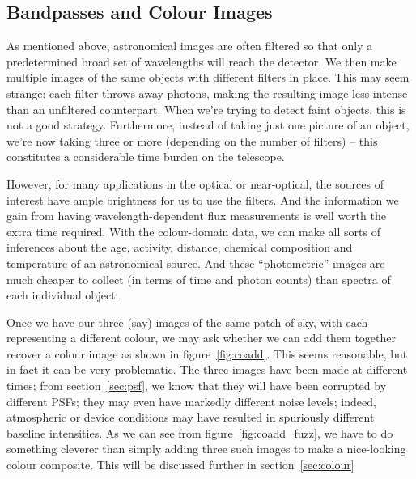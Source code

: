 \documentclass[letterpaper, 11pt]{article}
\begin{document}
\subsection{Bandpasses and Colour Images}
\label{sec:bands}

As mentioned above, astronomical images are often filtered so that only a predetermined broad set of wavelengths will reach the detector. We then make multiple images of the same objects with different filters in place. This may seem strange: each filter throws away photons, making the resulting image less intense than an unfiltered counterpart. When we're trying to detect faint objects, this is not a good strategy. Furthermore, instead of taking just one picture of an object, we're now taking three or more (depending on the number of filters) -- this constitutes a considerable time burden on the telescope.

However, for many applications in the optical or near-optical, the sources of interest have ample brightness for us to use the filters. And the information we gain from having wavelength-dependent flux measurements is well worth the extra time required. With the colour-domain data, we can make all sorts of inferences about the age, activity, distance, chemical composition and temperature of an astronomical source. And these ``photometric'' images are much cheaper to collect (in terms of time and photon counts) than spectra of each individual object.

Once we have our three (say) images of the same patch of sky, with each representing a different colour, we may ask whether we can add them together recover a colour image as shown in figure~\ref{fig:coadd}. This seems reasonable, but in fact it can be very problematic. The three images have been made at different times; from section~\ref{sec:psf}, we know that they will have been corrupted by different PSFs; they may even have markedly different noise levels; indeed, atmospheric or device conditions may have resulted in spuriously different baseline intensities. As we can see from figure~\ref{fig:coadd_fuzz}, we have to do something cleverer than simply adding three such images to make a nice-looking colour composite. This will be discussed further in section~\ref{sec:colour}
\end{document}
